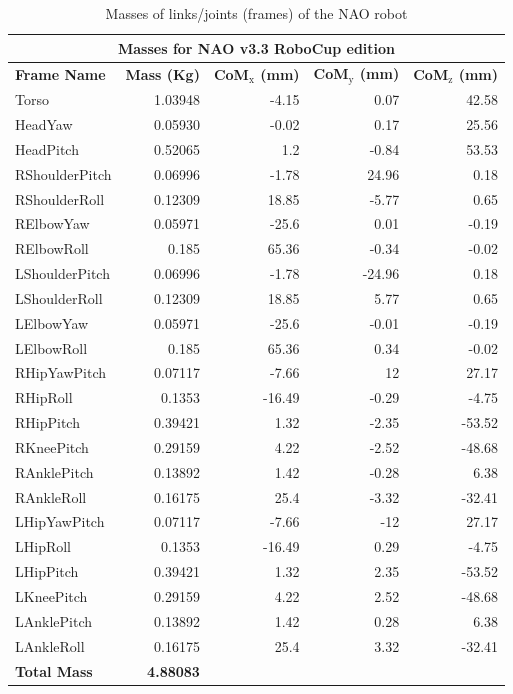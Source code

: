 \begin{table}[t!]
\caption{Masses of links/joints (frames) of the NAO robot}
\label{tab:Masses of NAO}
\begin{tabular}{|l|r|r|r|r|}
\hline
\multicolumn{5}{|c|}{\textbf{Masses for NAO v3.3 RoboCup edition}} \\ \hline
\textbf{Frame Name} & \textbf{Mass (Kg)} & \textbf{CoM$_{\text{x}}$ (mm)} & \textbf{CoM$_{\text{y}}$ (mm)} & \textbf{CoM$_{\text{z}}$ (mm)}\\ \hline
Torso & 1.03948 & -4.15 & 0.07 & 42.58 \\ \hline
HeadYaw & 0.05930 & -0.02 & 0.17 & 25.56 \\ \hline
HeadPitch & 0.52065 & 1.2 & -0.84 & 53.53 \\ \hline
RShoulderPitch & 0.06996 & -1.78 & 24.96 & 0.18 \\ \hline
RShoulderRoll & 0.12309 & 18.85 & -5.77 & 0.65 \\ \hline
RElbowYaw & 0.05971 & -25.6 & 0.01 & -0.19 \\ \hline
RElbowRoll & 0.185 & 65.36 & -0.34 & -0.02 \\ \hline
LShoulderPitch & 0.06996 & -1.78 & -24.96 & 0.18 \\ \hline
LShoulderRoll & 0.12309 & 18.85 & 5.77 & 0.65 \\ \hline
LElbowYaw & 0.05971 & -25.6 & -0.01 & -0.19 \\ \hline
LElbowRoll & 0.185 & 65.36 & 0.34 & -0.02 \\ \hline
RHipYawPitch & 0.07117 & -7.66 & 12 & 27.17 \\ \hline
RHipRoll & 0.1353 & -16.49 & -0.29 & -4.75 \\ \hline
RHipPitch & 0.39421 & 1.32 & -2.35 & -53.52 \\ \hline
RKneePitch & 0.29159 & 4.22 & -2.52 & -48.68 \\ \hline
RAnklePitch & 0.13892 & 1.42 & -0.28 & 6.38 \\ \hline
RAnkleRoll & 0.16175 & 25.4 & -3.32 & -32.41 \\ \hline
LHipYawPitch & 0.07117 & -7.66 & -12 & 27.17 \\ \hline
LHipRoll & 0.1353 & -16.49 & 0.29 & -4.75 \\ \hline
LHipPitch & 0.39421 & 1.32 & 2.35 & -53.52 \\ \hline
LKneePitch & 0.29159 & 4.22 & 2.52 & -48.68 \\ \hline
LAnklePitch & 0.13892 & 1.42 & 0.28 & 6.38 \\ \hline
LAnkleRoll & 0.16175 & 25.4 & 3.32 & -32.41 \\ \hline
\bf Total Mass & \bf 4.88083 %
& \multicolumn{3}{c|}{} \\  \hline
\end{tabular}
\end{table}

